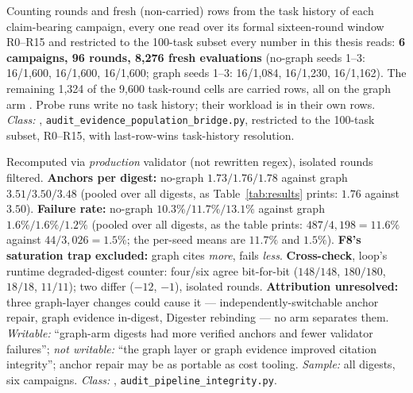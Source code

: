\begin{description}[leftmargin=0pt,labelindent=0pt,labelsep=0pt,style=nextline,font=\normalfont,itemsep=6pt]
\item[\textbf{F51}\quad The size of the evidence base.]
Counting rounds and fresh (non-carried) rows from the task history of each
claim-bearing campaign, every one read over its formal sixteen-round window
R0--R15 and restricted to the 100-task subset every number in this thesis
reads: \textbf{6 campaigns, 96 rounds, 8{,}276 fresh evaluations}
(no-graph seeds 1--3: 16/1{,}600, 16/1{,}600, 16/1{,}600; graph seeds
1--3: 16/1{,}084, 16/1{,}230, 16/1{,}162). The remaining 1{,}324 of the
9{,}600 task-round cells  are carried rows, all on the graph arm
.
Probe runs write no task history; their workload is in their own rows.
\emph{Class:} ,
\texttt{audit\_evidence\_population\_bridge.py}, restricted to the
100-task subset, R0--R15, with last-row-wins task-history resolution.

\item[\textbf{F52}\quad Citation integrity.]
Recomputed via \emph{production} validator (not rewritten regex),
isolated rounds filtered. \textbf{Anchors per digest:} no-graph
$1.73/1.76/1.78$ against graph $\mathbf{3.51/3.50/3.48}$ (pooled over all
digests, as Table~\ref{tab:results} prints: $1.76$ against $3.50$).
\textbf{Failure rate:} no-graph $10.3\%/11.7\%/13.1\%$ against graph
$\mathbf{1.6\%/1.6\%/1.2\%}$ (pooled over all digests, as the table prints:
$487/4{,}198 = 11.6\%$ against $44/3{,}026 = 1.5\%$; the per-seed means are
$11.7\%$ and $1.5\%$). \textbf{F8's saturation trap excluded:}
graph cites \emph{more}, fails \emph{less}. \textbf{Cross-check},
loop's runtime degraded-digest counter: four/six agree bit-for-bit
($148/148$, $180/180$, $18/18$, $11/11$); two differ ($-12$, $-1$),
isolated rounds. \textbf{Attribution unresolved:} three graph-layer
changes could cause it --- independently-switchable anchor repair,
graph evidence in-digest, Digester rebinding --- no arm separates
them. \emph{Writable:} ``graph-arm digests had more verified anchors and fewer
validator failures''; \emph{not writable:} ``the graph layer or graph evidence
improved citation integrity'';
anchor repair may be as portable as cost tooling.
\emph{Sample:} all digests, six campaigns.
\emph{Class:} , \texttt{audit\_pipeline\_integrity.py}.


\end{description}
